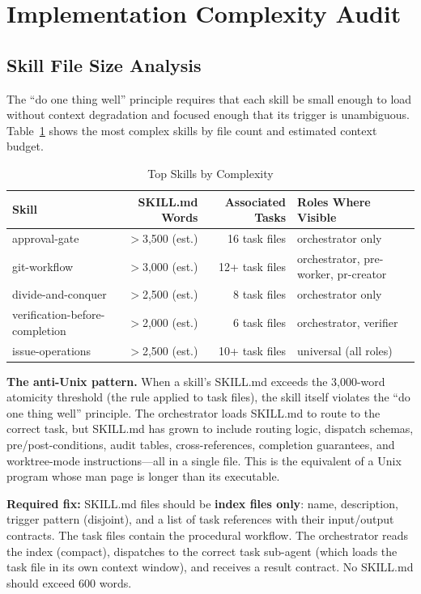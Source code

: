 \documentclass[11pt,a4paper]{article}
\begin{document}
\newpage

\section{Implementation Complexity Audit}

\subsection{Skill File Size Analysis}

The ``do one thing well'' principle requires that each skill be small enough to load without context degradation and focused enough that its trigger is unambiguous.  Table~\ref{tab:complexity} shows the most complex skills by file count and estimated context budget.

\begin{table}[htbp]
\centering
\caption{Top Skills by Complexity}
\label{tab:complexity}
\small
\begin{tabular}{@{}p{3.8cm}rrp{3cm}@{}}
\toprule
\textbf{Skill}              & \textbf{SKILL.md Words} & \textbf{Associated Tasks} & \textbf{Roles Where Visible} \\
\midrule
approval-gate               & $>$3,500 (est.)         & 16 task files             & orchestrator only \\
git-workflow                & $>$3,000 (est.)         & 12+ task files            & orchestrator, pre-worker, pr-creator \\
divide-and-conquer          & $>$2,500 (est.)         & 8 task files              & orchestrator only \\
verification-before-completion & $>$2,000 (est.)      & 6 task files              & orchestrator, verifier \\
issue-operations            & $>$2,500 (est.)         & 10+ task files            & universal (all roles) \\
\bottomrule
\end{tabular}
\end{table}

\begin{gapbox}
\textbf{The anti-Unix pattern.}  When a skill's SKILL.md exceeds the 3,000-word atomicity threshold (the rule applied to task files), the skill itself violates the ``do one thing well'' principle.  The orchestrator loads SKILL.md to route to the correct task, but SKILL.md has grown to include routing logic, dispatch schemas, pre/post-conditions, audit tables, cross-references, completion guarantees, and worktree-mode instructions---all in a single file.  This is the equivalent of a Unix program whose man page is longer than its executable.

\textbf{Required fix:}  SKILL.md files should be \textbf{index files only}: name, description, trigger pattern (disjoint), and a list of task references with their input/output contracts.  The task files contain the procedural workflow.  The orchestrator reads the index (compact), dispatches to the correct task sub-agent (which loads the task file in its own context window), and receives a result contract.  No SKILL.md should exceed 600 words.
\end{gapbox}
\end{document}
